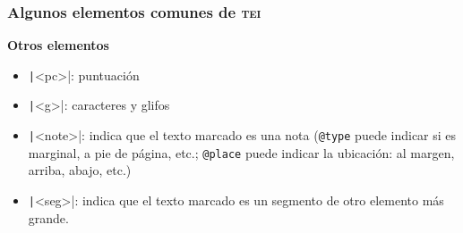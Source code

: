 \documentclass[%
  handout, %
  ]{beamer}
\newcommand*{\azul}[1]{\textcolor{bluenivaca}{#1}}
\newcommand*{\TEI}{\textsc{tei}}
\begin{document}
\begin{frame}
  \frametitle{Algunos elementos comunes de \TEI}

  \textbf{\azul{Otros elementos}}

  \smallskip

  \begin{itemize}
    \item \texttt|<pc>|: puntuación 
    \item \texttt|<g>|: caracteres y glifos
    \item \texttt|<note>|: indica que el texto marcado es una nota (\texttt{@type} puede indicar si es marginal, a pie de página, etc.; \texttt{@place} puede indicar la ubicación: al margen, arriba, abajo, etc.)
    \item \texttt|<seg>|: indica que el texto marcado es un segmento de otro elemento más grande. 
  \end{itemize}
\end{frame}
\end{document}
